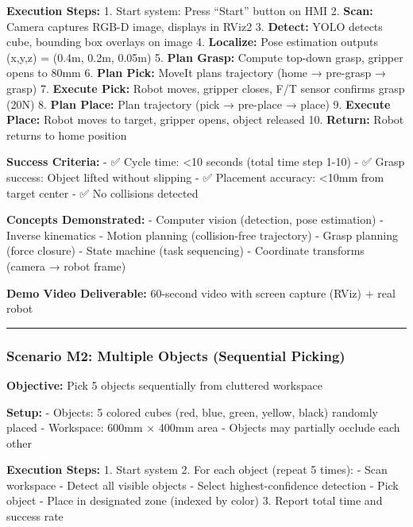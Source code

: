 \documentclass[
]{article}
\begin{document}
\textbf{Execution Steps:} 1. Start system: Press ``Start'' button on HMI
2. \textbf{Scan:} Camera captures RGB-D image, displays in RViz2 3.
\textbf{Detect:} YOLO detects cube, bounding box overlays on image 4.
\textbf{Localize:} Pose estimation outputs (x,y,z) = (0.4m, 0.2m, 0.05m)
5. \textbf{Plan Grasp:} Compute top-down grasp, gripper opens to 80mm 6.
\textbf{Plan Pick:} MoveIt plans trajectory (home → pre-grasp → grasp)
7. \textbf{Execute Pick:} Robot moves, gripper closes, F/T sensor
confirms grasp (20N) 8. \textbf{Plan Place:} Plan trajectory (pick →
pre-place → place) 9. \textbf{Execute Place:} Robot moves to target,
gripper opens, object released 10. \textbf{Return:} Robot returns to
home position

\textbf{Success Criteria:} - ✅ Cycle time: \textless10 seconds (total
time step 1-10) - ✅ Grasp success: Object lifted without slipping - ✅
Placement accuracy: \textless10mm from target center - ✅ No collisions
detected

\textbf{Concepts Demonstrated:} - Computer vision (detection, pose
estimation) - Inverse kinematics - Motion planning (collision-free
trajectory) - Grasp planning (force closure) - State machine (task
sequencing) - Coordinate transforms (camera → robot frame)

\textbf{Demo Video Deliverable:} 60-second video with screen capture
(RViz) + real robot

\begin{center}\rule{0.5\linewidth}{0.5pt}\end{center}

\hypertarget{scenario-m2-multiple-objects-sequential-picking}{%
\subsubsection{Scenario M2: Multiple Objects (Sequential
Picking)}\label{scenario-m2-multiple-objects-sequential-picking}}

\textbf{Objective:} Pick 5 objects sequentially from cluttered workspace

\textbf{Setup:} - Objects: 5 colored cubes (red, blue, green, yellow,
black) randomly placed - Workspace: 600mm × 400mm area - Objects may
partially occlude each other

\textbf{Execution Steps:} 1. Start system 2. For each object (repeat 5
times): - Scan workspace - Detect all visible objects - Select
highest-confidence detection - Pick object - Place in designated zone
(indexed by color) 3. Report total time and success rate
\end{document}
